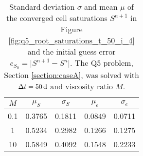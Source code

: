 \begin{table}%
\caption{Standard deviation $\sigma$ and mean $\mu$ of the converged cell saturations $S^{n+1}$ in Figure \ref{fig:q5_root_saturations_t_50_i_4} and the initial guess error $e_{S_0} = \lvert S^{n+1} - S^n \rvert$. The Q5 problem, Section \ref{section:caseA}, was solved with $\Delta t = \unit[50]{d}$ and viscosity ratio $M$.}%
\label{table:q5_saturations_statisitcs_t_50_i_4}%
\centering%
\begin{tabular}{ ccc cc }%
\hline
$M$ & $\mu_{S}$ & $\sigma_{S}$ & $\mu_{e}$ & $\sigma_{e}$  \\
\hline
0.1 & 0.3765 & 0.1811 & 0.0849 & 0.0711 \\
1 & 0.5234 & 0.2982 & 0.1266 & 0.1275 \\
10 & 0.5849 & 0.4092 & 0.1548 & 0.2233 \\
\hline
\end{tabular}%
\end{table}%